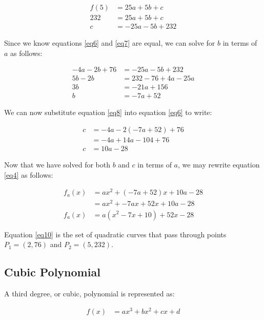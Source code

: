 \documentclass[preview,border=3mm]{article}
\begin{document}
\begin{align}
    f(5) &= 25a + 5b + c \nonumber \\
    232  &= 25a + 5b + c \nonumber \\
    c    &= -25a - 5b + 232 \label{eq7}
\end{align}

\noindent
Since we know equations \ref{eq6} and \ref{eq7} are equal, we can solve for $b$
in terms of $a$ as follows:

\begin{align}
    -4a - 2b + 76 &= -25a - 5b + 232 \nonumber \\
    5b - 2b       &= 232 - 76 + 4a - 25a \nonumber \\
    3b            &= -21a + 156 \nonumber\\
    b             &= -7a + 52 \label{eq8}
\end{align}

\noindent
We can now substitute equation \ref{eq8} into equation \ref{eq6} to write:

\begin{align}
    c &= -4a - 2(-7a + 52) + 76 \nonumber \\
      &= -4a + 14a - 104 + 76 \nonumber \\
    c &= 10a - 28 \label{eq9}
\end{align}

\noindent
Now that we have solved for both $b$ and $c$ in terms of $a$, we may rewrite
equation \ref{eq4} as follows:

\begin{align}
    f_a(x) &= ax^2 + (-7a + 52)x + 10a - 28 \nonumber \\
           &= ax^2 + -7ax + 52x + 10a - 28 \nonumber \\
    f_a(x) &= a(x^2 - 7x + 10) + 52x - 28 \label{eq10}
\end{align}

\noindent
Equation \ref{eq10} is the set of quadratic curves that pass through points
$P_1 = (2, 76)$ and $P_2 = (5, 232)$.


\subsection{Cubic Polynomial}

\noindent
A third degree, or cubic, polynomial is represented as:

\begin{align}
    f(x) &= ax^3 + bx^2 + cx + d \label{eq11}
\end{align}
\end{document}
